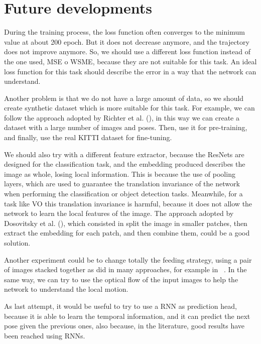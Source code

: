 \section{Future developments}\label{sec:future-developments}

During the training process, the loss function often converges to the minimum value at about 200 epoch.
But it does not decrease anymore, and the trajectory does not improve anymore.
So, we should use a different loss function instead of the one used, MSE o WSME, because they are not suitable for this task.
An ideal loss function for this task should describe the error in a way that the network can understand.

Another problem is that we do not have a large amount of data, so we should create synthetic dataset which is more suitable for this task.
For example, we can follow the approach adopted by Richter et al. (\cite{synthetic_dataset}), in this way we can create a dataset with a large number of images and poses.
Then, use it for pre-training, and finally, use the real KITTI dataset for fine-tuning.

We should also try with a different feature extractor, because the ResNets are designed for the classification task, and the embedding produced describes the image as whole, losing local information.
This is because the use of pooling layers, which are used to guarantee the translation invariance of the network when performing the classification or object detection tasks.
Meanwhile, for a task like VO this translation invariance is harmful, because it does not allow the network to learn the local features of the image.
The approach adopted by Dosovitsky et al. (\cite{vit_paper}), which consisted in split the image in smaller patches, then extract the embedding for each patch, and then combine them, could be a good solution.

Another experiment could be to change totally the feeding strategy, using a pair of images stacked together as did in many approaches, for example in ~\cite{deep_vo}.
In the same way, we can try to use the optical flow of the input images to help the network to understand the local motion.

As last attempt, it would be useful to try to use a RNN as prediction head, because it is able to learn the temporal information, and it can predict the next pose given the previous ones, also because, in the literature, good results have been reached using RNNs.